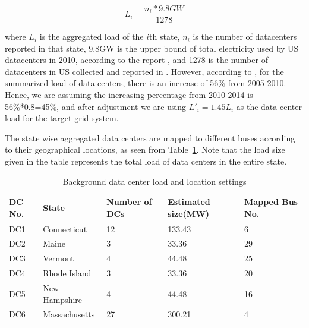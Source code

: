 \begin{itemize}
{\begin{equation}
L_i=\frac{n_i*9.8GW}{1278}
\end{equation}

\noindent where $L_i$ is the aggregated load of the $i$th state, $n_i$ is the number of datacenters reported in that state,  9.8GW is the upper bound of total electricity used by US datacenters in 2010, according to the report \cite{Koomey2011}, and 1278 is the number of datacenters in US collected and reported in \cite{DCmap}. However, according to \cite{Koomey2011}, for the summarized load of data centers, there is an increase of 56\% from 2005-2010. Hence, we are assuming the increasing percentage from 2010-2014 is 56\%*0.8=45\%, and after adjustment we are using $L'_i=1.45L_i$ as the data center load for the target grid system.

The state wise aggregated data centers are mapped to different buses according to their geographical locations, as seen from Table~\ref{tab:dc_setting}. Note that the load size given in the table represents the total load of data centers in the entire state.

\begin{table}[ht]
\begin{center}
\caption{Background data center load and location settings}
\begin{tabular}{|l|l|p{30pt}|p{30pt}|p{30pt}|}
\hline
DC No. & State & Number of DCs & Estimated size(MW) & Mapped Bus No.\\
\hline
DC1 & Connecticut & 12 &133.43 & 6\\
DC2 & Maine & 3 &33.36 & 29 \\
DC3 & Vermont & 4 &44.48 & 25 \\
DC4 & Rhode Island & 3 &33.36 & 20\\
DC5 & New Hampshire & 4& 44.48 & 16\\
DC6 & Massachusetts & 27& 300.21 & 4 \\
\hline

\end{tabular}
   \vspace{.05in}
\label{tab:dc_setting}
\end{center}
\end{table}
}


\end{itemize}
